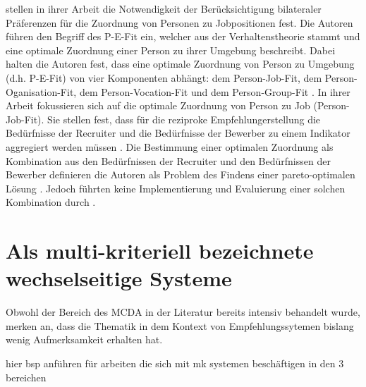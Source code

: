 \textcite[S. 1ff.]{malinowski:2006} stellen in ihrer Arbeit die Notwendigkeit der Berücksichtigung bilateraler Präferenzen für die Zuordnung von Personen zu Jobpositionen fest.
Die Autoren führen den Begriff des \ac{P-E-Fit} ein, welcher aus der Verhaltenstheorie \cite[S. 3]{malinowski:2006} stammt und eine optimale Zuordnung einer Person zu ihrer Umgebung beschreibt.
Dabei halten die Autoren fest, dass eine optimale Zuordnung von Person zu Umgebung (d.h. \ac{P-E-Fit}) von vier Komponenten abhängt: dem Person-Job-Fit, dem Person-Oganisation-Fit, dem Person-Vocation-Fit und dem Person-Group-Fit \cite[S. 3]{malinowski:2006}.
In ihrer Arbeit fokussieren sich \textcite[S. 4]{malinowski:2006} auf die optimale Zuordnung von Person zu Job (Person-Job-Fit).
Sie stellen fest, dass für die reziproke Empfehlungerstellung die Bedürfnisse der Recruiter und die Bedürfnisse der Bewerber zu einem Indikator \cite[S. 922]{siting:2012} aggregiert werden müssen \cite[S. 5]{malinowski:2006}.
Die Bestimmung einer optimalen Zuordnung als Kombination aus den Bedürfnissen der Recruiter und den Bedürfnissen der Bewerber definieren die Autoren als Problem des Findens einer pareto-optimalen Lösung \cite[S. 5]{malinowski:2006}.
Jedoch führten \textcite[S. 1ff.]{malinowski:2006} keine Implementierung und Evaluierung einer solchen Kombination durch \cite[S. 549]{koprinska:inbook}.



\section{Als multi-kriteriell bezeichnete wechselseitige Systeme}
Obwohl der Bereich des \ac{MCDA} in der Literatur bereits intensiv behandelt wurde, merken \textcite[S. 248]{kim:2:inproceedings} an, dass die Thematik in dem Kontext von Empfehlungssytemen bislang wenig Aufmerksamkeit erhalten hat.

hier bsp anführen für arbeiten die sich mit mk systemen beschäftigen in den 3 bereichen

